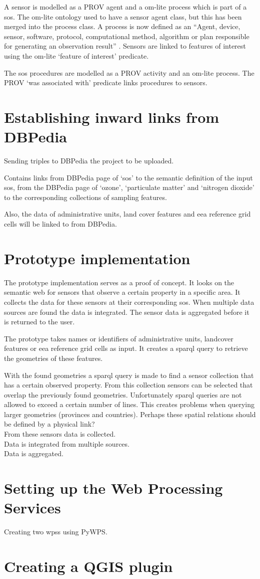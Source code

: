 A sensor is modelled as a PROV agent and a om-lite process which is part of a \ac{sos}. The om-lite ontology used to have a sensor agent class, but this has been merged into the process class. A process is now defined as an \enquote{Agent, device, sensor, software, protocol, computational method, algorithm or plan responsible for generating an observation result} \citep{SSW:Cox}. Sensors are linked to features of interest using the om-lite `feature of interest' predicate.

The \ac{sos} procedures are modelled as a PROV activity and an om-lite process. The PROV `was associated with' predicate links procedures to sensors.     


\section{Establishing inward links from DBPedia}
Sending triples to DBPedia the project to be uploaded.

Contains links from DBPedia page of `\acl{sos}' to the semantic definition of the input \ac{sos}, from the DBPedia page of `ozone', `particulate matter' and `nitrogen dioxide' to the corresponding collections of sampling features.

Also, the data of administrative units, land cover features and \ac{eea} reference grid cells will be linked to from DBPedia.

\section{Prototype implementation}
The prototype implementation serves as a proof of concept. It looks on the semantic web for sensors that observe a certain property in a specific area. It collects the data for these sensors at their corresponding \acl{sos}. When multiple data sources are found the data is integrated. The sensor data is aggregated before it is returned to the user.

The prototype takes names or identifiers of administrative units, landcover features or \ac{eea} reference grid cells as input. It creates a \ac{sparql} query to retrieve the geometries of these features. 

With the found geometries a \ac{sparql} query is made to find a sensor collection that has a certain observed property. From this collection sensors can be selected that overlap the previously found geometries. Unfortunately \ac{sparql} queries are not allowed to exceed a certain number of lines. This creates problems when querying larger geometries (provinces and countries). Perhaps these spatial relations should be defined by a physical link? \\

From these sensors data is collected. \\

Data is integrated from multiple sources.\\

Data is aggregated.

\section{Setting up the Web Processing Services}
Creating two \aclp{wps} using PyWPS.

\section{Creating a QGIS plugin}
